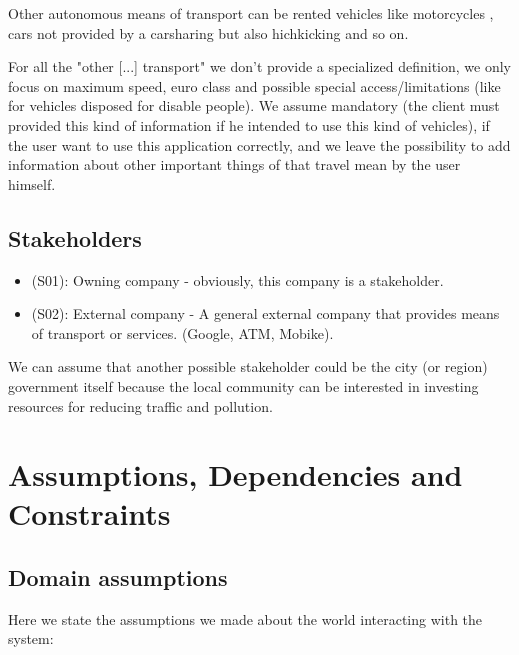 \documentclass[a4paper,leqno]{book}
\begin{document}
Other autonomous means of transport can be rented vehicles like motorcycles , cars not provided by a carsharing but also hichkicking and so on.

For all the "other [...] transport" we don't provide a specialized definition, we only focus on maximum speed, euro class and possible special access/limitations (like for vehicles disposed for disable people). We assume mandatory (the client must provided this kind of information if he intended to use this kind of vehicles), if the user want to use this application correctly, and we leave the possibility to add information about other important things of that travel mean by the user himself.


\subsection{Stakeholders}
\begin{itemize}

\item (S01): Owning company - obviously, this company is a stakeholder.
\item (S02): External company - A general external company that provides means of transport or services. (Google, ATM, Mobike).

\end{itemize}

We can assume that another possible stakeholder could be the city (or region) government itself because the local community can be interested in investing resources for reducing traffic and pollution.\\

\section{Assumptions, Dependencies and Constraints}

\subsection{Domain assumptions}
Here we state the assumptions we made about the world interacting with the system:\\
\end{document}
